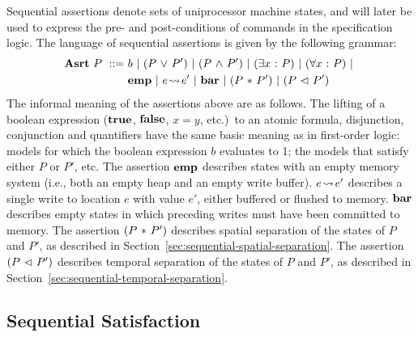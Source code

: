 \documentclass[11pt]{report}         %
\begin{document}
Sequential assertions denote sets of uniprocessor machine states, and will later be used to express the pre- and post-conditions of commands in the specification logic. The language of sequential assertions is given by the following grammar: \begin{align*}
    \mathbf{Asrt}~P ~::=~ & b ~|~ (P \operatorname{\,\vee\,} P') ~|~ (P \operatorname{\,\wedge\,} P') ~|~ (\exists x \operatorname{\,:\,} P) ~|~ (\forall x \operatorname{\,:\,} P) ~|~ \\ & \mathbf{emp} ~|~ e \!\leadsto\! e' ~|~ \mathbf{bar} ~|~ (P \operatorname{\,\ast\,} P') ~|~  (P \operatorname{\,\vartriangleleft\,} P')
\end{align*} 
The informal meaning of the assertions above are as follows. The lifting of a boolean expression ($\mathbf{true}$, $\mathbf{false}$, $x = y$, etc.)\ to an atomic formula, disjunction, conjunction and quantifiers have the same basic meaning as in first-order logic: models for which the boolean expression $b$ evaluates to 1; the models that satisfy either $P$ or $P'$, etc. The assertion $\mathbf{emp}$ describes states with an empty memory system (i.e., both an empty heap and an empty write buffer). $e \!\leadsto\! e'$ describes a single write to location $e$ with value $e'$, either buffered or flushed to memory. $\mathbf{bar}$ describes empty states in which preceding writes must have been committed to memory. The assertion $(P \operatorname{\,\ast\,} P')$ describes spatial separation of the states of $P$ and $P'$, as described in Section~\ref{sec:sequential-spatial-separation}. The assertion $(P \operatorname{\,\vartriangleleft\,} P')$ describes temporal separation of the states of $P$ and $P'$, as described in Section~\ref{sec:sequential-temporal-separation}. 

\subsection{Sequential Satisfaction}
\label{sec:uniprocessor-satisfaction}
\end{document}
